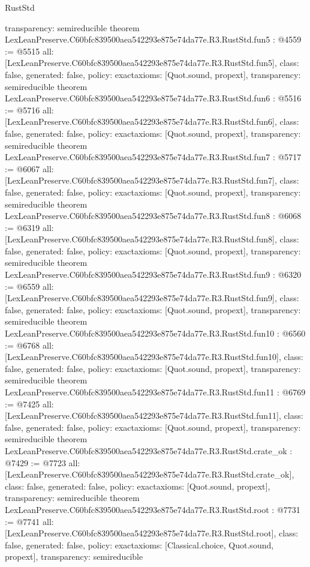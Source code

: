 \begin{lexlean}{RustStd}
\begin{coremodule}
{  transparency: semireducible
}
theorem LexLeanPreserve.C60bfc839500aea542293e875e74da77e.R3.RustStd.fun5 : @4559 := @5515 {
  all: [LexLeanPreserve.C60bfc839500aea542293e875e74da77e.R3.RustStd.fun5],
  class: false,
  generated: false,
  policy: exact{axioms: [Quot.sound, propext]},
  transparency: semireducible
}
theorem LexLeanPreserve.C60bfc839500aea542293e875e74da77e.R3.RustStd.fun6 : @5516 := @5716 {
  all: [LexLeanPreserve.C60bfc839500aea542293e875e74da77e.R3.RustStd.fun6],
  class: false,
  generated: false,
  policy: exact{axioms: [Quot.sound, propext]},
  transparency: semireducible
}
theorem LexLeanPreserve.C60bfc839500aea542293e875e74da77e.R3.RustStd.fun7 : @5717 := @6067 {
  all: [LexLeanPreserve.C60bfc839500aea542293e875e74da77e.R3.RustStd.fun7],
  class: false,
  generated: false,
  policy: exact{axioms: [Quot.sound, propext]},
  transparency: semireducible
}
theorem LexLeanPreserve.C60bfc839500aea542293e875e74da77e.R3.RustStd.fun8 : @6068 := @6319 {
  all: [LexLeanPreserve.C60bfc839500aea542293e875e74da77e.R3.RustStd.fun8],
  class: false,
  generated: false,
  policy: exact{axioms: [Quot.sound, propext]},
  transparency: semireducible
}
theorem LexLeanPreserve.C60bfc839500aea542293e875e74da77e.R3.RustStd.fun9 : @6320 := @6559 {
  all: [LexLeanPreserve.C60bfc839500aea542293e875e74da77e.R3.RustStd.fun9],
  class: false,
  generated: false,
  policy: exact{axioms: [Quot.sound, propext]},
  transparency: semireducible
}
theorem LexLeanPreserve.C60bfc839500aea542293e875e74da77e.R3.RustStd.fun10 : @6560 := @6768 {
  all: [LexLeanPreserve.C60bfc839500aea542293e875e74da77e.R3.RustStd.fun10],
  class: false,
  generated: false,
  policy: exact{axioms: [Quot.sound, propext]},
  transparency: semireducible
}
theorem LexLeanPreserve.C60bfc839500aea542293e875e74da77e.R3.RustStd.fun11 : @6769 := @7425 {
  all: [LexLeanPreserve.C60bfc839500aea542293e875e74da77e.R3.RustStd.fun11],
  class: false,
  generated: false,
  policy: exact{axioms: [Quot.sound, propext]},
  transparency: semireducible
}
theorem LexLeanPreserve.C60bfc839500aea542293e875e74da77e.R3.RustStd.crate_ok : @7429 := @7723 {
  all: [LexLeanPreserve.C60bfc839500aea542293e875e74da77e.R3.RustStd.crate_ok],
  class: false,
  generated: false,
  policy: exact{axioms: [Quot.sound, propext]},
  transparency: semireducible
}
theorem LexLeanPreserve.C60bfc839500aea542293e875e74da77e.R3.RustStd.root : @7731 := @7741 {
  all: [LexLeanPreserve.C60bfc839500aea542293e875e74da77e.R3.RustStd.root],
  class: false,
  generated: false,
  policy: exact{axioms: [Classical.choice, Quot.sound, propext]},
  transparency: semireducible
}


\end{coremodule}
\end{lexlean}
